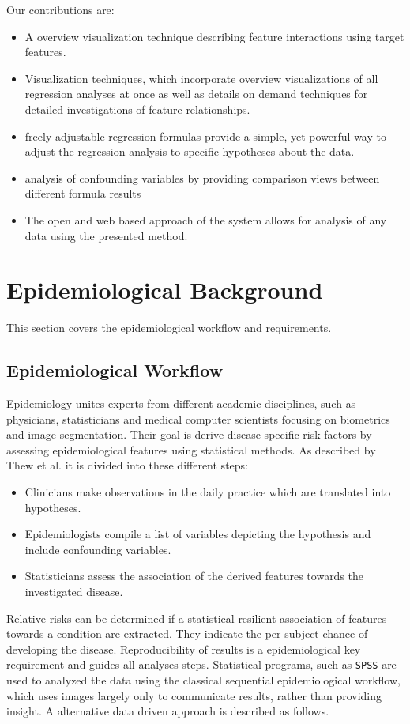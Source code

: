 \documentclass[journal]{style/vgtc} 			          %
\begin{document}
Our contributions are:
\begin{itemize}
	\item A overview visualization technique describing feature interactions using target features.
	\item Visualization techniques, which incorporate overview visualizations of all regression analyses at once as well as details on demand techniques for detailed investigations of feature relationships.
	\item freely adjustable regression formulas provide a simple, yet powerful way to adjust the regression analysis to specific hypotheses about the data.
	\item analysis of confounding variables by providing comparison views between different formula results
	\item The open and web based approach of the system allows for analysis of any data using the presented method.
\end{itemize}

\section{Epidemiological Background} \label{sec:Background}
This section covers the epidemiological workflow and requirements.
\subsection{Epidemiological Workflow} \label{EpidemiologicalWorkflow}
Epidemiology unites experts from different academic disciplines, such as physicians, statisticians and medical computer scientists focusing on biometrics and image segmentation.
Their goal is derive disease-specific risk factors by assessing epidemiological features using statistical methods.
As described by Thew et al. \cite{Thew2009} it is divided into these different steps:
\begin{itemize}
	\item Clinicians make observations in the daily practice which are translated into hypotheses.
	\item Epidemiologists compile a list of variables depicting the hypothesis and include confounding variables.
	\item Statisticians assess the association of the derived features towards the investigated disease.
\end{itemize}
Relative risks can be determined if a statistical resilient association of features towards a condition are extracted.
They indicate the per-subject chance of developing the disease.
Reproducibility of results is a epidemiological key requirement and guides all analyses steps.
Statistical programs, such as \texttt{SPSS} are used to analyzed the data using the classical sequential epidemiological workflow, which uses images largely only to communicate results, rather than providing insight.
A alternative data driven approach is described as follows.
\end{document}
